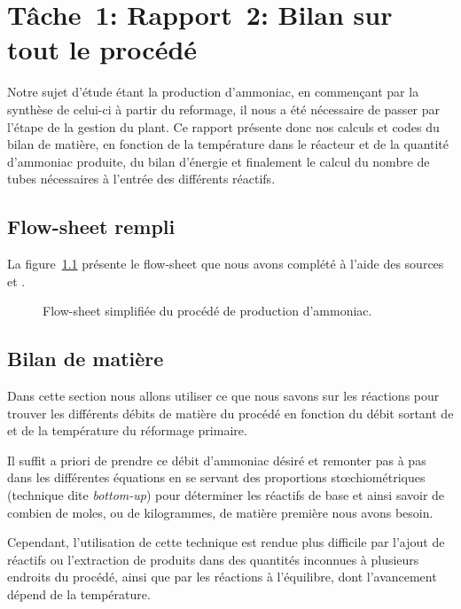 \chapter{Tâche~1: Rapport~2: Bilan sur tout le procédé}

Notre sujet d'étude étant la production d’ammoniac, en commençant par la synthèse de celui-ci à partir du reformage, il nous a été nécessaire de passer par l’étape de la gestion du plant. Ce rapport présente donc nos calculs et codes \matlab{} du bilan de matière, en fonction de la température dans le réacteur et de la quantité d’ammoniac produite, du bilan d’énergie et finalement le calcul du nombre de tubes nécessaires à l’entrée des différents réactifs. 

\section{Flow-sheet rempli}

La figure~\ref{fig:flowsheet2} présente le flow-sheet que nous avons complété à l'aide des sources \cite{epa} et \cite{process-patent}.

\begin{figure}
    \centering
    
    \caption{Flow-sheet simplifiée du procédé de production d'ammoniac.}
    \label{fig:flowsheet2}
\end{figure}
%    

\section{Bilan de matière}

Dans cette section nous allons utiliser ce que nous savons
sur les réactions pour trouver les différents débits de matière du procédé
en fonction du débit sortant de 
et de la température du réformage primaire.

Il suffit a priori de prendre ce débit
d’ammoniac désiré et remonter pas à pas
dans les différentes équations en se servant des proportions stœchiométriques
(technique dite \emph{bottom-up})
pour déterminer les réactifs de base
et ainsi savoir de combien de moles, ou de kilogrammes, de matière première
nous avons besoin.

Cependant, l'utilisation de cette technique est rendue plus difficile par
l'ajout de réactifs ou l'extraction de produits dans des quantités inconnues
à plusieurs endroits du procédé, ainsi que par les réactions à l'équilibre,
dont l'avancement dépend de la température.


